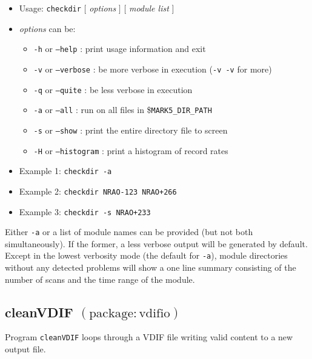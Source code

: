\begin{itemize}
\item[] Usage: {\tt checkdir} $[$ {\em options} $]$ $[$ {\em module list} $]$
\item[] {\em options} can be:
\begin{itemize}
\item[] {\tt -h} or {\tt --help} : print usage information and exit
\item[] {\tt -v} or {\tt --verbose} : be more verbose in execution ({\tt -v -v} for more)
\item[] {\tt -q} or {\tt --quite} : be less verbose in execution
\item[] {\tt -a} or {\tt --all} : run on all files in \${\tt MARK5\_DIR\_PATH} 
\item[] {\tt -s} or {\tt --show} : print the entire directory file to screen
\item[] {\tt -H} or {\tt --histogram} : print a histogram of record rates
\end{itemize}
\item[] Example 1: {\tt checkdir -a}
\item[] Example 2: {\tt checkdir NRAO-123 NRAO+266}
\item[] Example 3: {\tt checkdir -s NRAO+233}
\end{itemize}

Either {\tt -a} or a list of module names can be provided (but not both simultaneously).
If the former, a less verbose output will be generated by default.
Except in the lowest verbosity mode (the default for {\tt -a}), module directories without any detected problems will show a one line summary consisting of the number of scans and the time range of the module.








\subsection{cleanVDIF {\small $\mathrm{(package: vdifio)}$} \label{sec:printVDIF}}

Program {\tt cleanVDIF} loops through a VDIF file writing valid content to a new output file.

